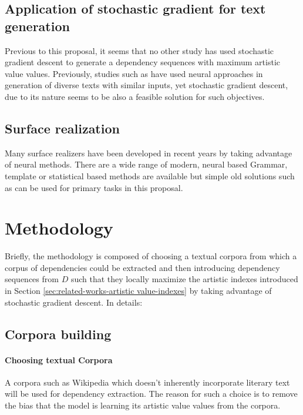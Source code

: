 \documentclass{article}
\begin{document}
	\subsection{Application of stochastic gradient for text generation} 
	Previous to this proposal, it seems that no other study has used stochastic gradient descent to generate a dependency sequences with maximum artistic value values. Previously, studies such as  \citep{welleck-2019-neural-text-generation-with-unlikelihood-training,wellek-2019-non-monotonic-sequential-text-generation,welleck-2019-neural-text-generation-with-unlikelihood-training} have used neural approaches in generation of diverse texts with similar inputs, yet stochastic gradient descent, due to its nature seems to be also a feasible solution for such objectives.   
	
	\subsection{Surface realization} \label{sec:related-works-surface-realization} 
	Many surface realizers have been developed in recent years by taking advantage of neural methods. There are a wide range of modern, neural based Grammar, template  or statistical based methods are available but simple old solutions such as \cite{lavoie-1999-a-fast-and-portable-realizer-for-text-generation-systems} can be used for primary tasks in this proposal.  
	
	\section{Methodology} \label{sec:methodology}
	Briefly, the methodology is composed of choosing a textual corpora from which a corpus of dependencies could be extracted and then introducing dependency sequences from $D$ such that they locally maximize the artistic indexes introduced in Section \ref{sec:related-works-artistic value-indexes} by taking advantage of stochastic gradient descent. In details:
	\subsection{Corpora building}
	\paragraph{Choosing textual Corpora} A corpora such as Wikipedia which doesn't inherently incorporate literary text will be used for dependency extraction. The reason for such a choice is to remove the bias that the model is learning its artistic value values from the corpora. 
\end{document}
